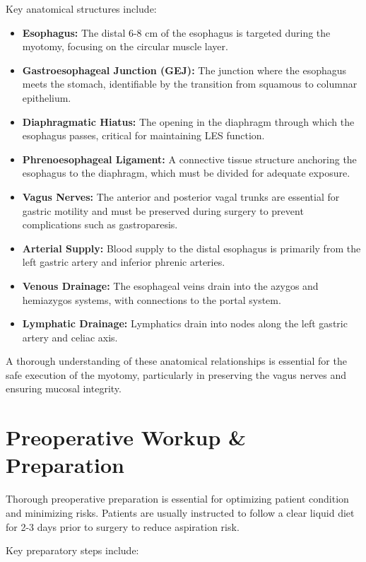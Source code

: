 Key anatomical structures include:

\begin{itemize}
  \item \textbf{Esophagus:} The distal 6-8 cm of the esophagus is targeted during the myotomy, focusing on the circular muscle layer.
  \item \textbf{Gastroesophageal Junction (GEJ):} The junction where the esophagus meets the stomach, identifiable by the transition from squamous to columnar epithelium.
  \item \textbf{Diaphragmatic Hiatus:} The opening in the diaphragm through which the esophagus passes, critical for maintaining LES function.
  \item \textbf{Phrenoesophageal Ligament:} A connective tissue structure anchoring the esophagus to the diaphragm, which must be divided for adequate exposure.
  \item \textbf{Vagus Nerves:} The anterior and posterior vagal trunks are essential for gastric motility and must be preserved during surgery to prevent complications such as gastroparesis.
  \item \textbf{Arterial Supply:} Blood supply to the distal esophagus is primarily from the left gastric artery and inferior phrenic arteries.
  \item \textbf{Venous Drainage:} The esophageal veins drain into the azygos and hemiazygos systems, with connections to the portal system.
  \item \textbf{Lymphatic Drainage:} Lymphatics drain into nodes along the left gastric artery and celiac axis.
\end{itemize}

A thorough understanding of these anatomical relationships is essential for the safe execution of the myotomy, particularly in preserving the vagus nerves and ensuring mucosal integrity.

\section*{Preoperative Workup \& Preparation}
Thorough preoperative preparation is essential for optimizing patient condition and minimizing risks. Patients are usually instructed to follow a clear liquid diet for 2-3 days prior to surgery to reduce aspiration risk.

Key preparatory steps include:

